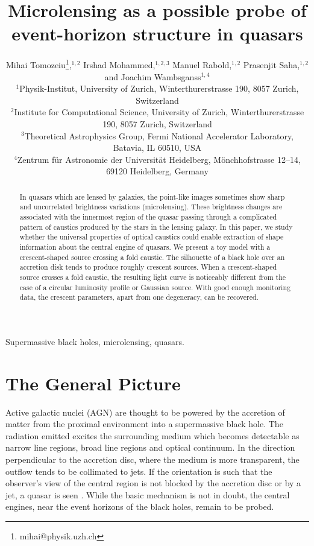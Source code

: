 \documentclass[usenatbib]{mn2e}
\title{Microlensing as a possible probe of event-horizon structure in quasars}
\author[Tomozeiu et al]{Mihai Tomozeiu\thanks{mihai@physik.uzh.ch},$^{1,2}$ 
Irshad Mohammed,$^{1,2,3}$ 
Manuel Rabold,$^{1,2}$
Prasenjit Saha,$^{1,2}$  
\newauthor
and Joachim Wambsganss$^{1,4}$\\
$^1${Physik-Institut, University of Zurich, Winterthurerstrasse 190,
  8057 Zurich, Switzerland} \\
$^2${Institute for Computational Science, University of Zurich,
  Winterthurerstrasse 190, 8057 Zurich, Switzerland} \\
$^3${Theoretical Astrophysics Group, Fermi National Accelerator Laboratory, Batavia, IL 60510, USA}\\
$^4${Zentrum f\"ur Astronomie der Universit\"at Heidelberg,
  M\"onchhofstrasse 12--14, 69120 Heidelberg, Germany}
}
\begin{document}
\maketitle

\begin{abstract}

In quasars which are lensed by galaxies, the point-like images sometimes show sharp and uncorrelated brightness 
variations (microlensing). These brightness changes are associated with the innermost region of the quasar passing 
through a complicated pattern of caustics produced by the stars in the lensing galaxy. In this paper, we study 
whether the universal properties of optical caustics could enable extraction of shape information about the central 
engine of quasars. We present a toy model with a crescent-shaped source crossing a fold caustic. The silhouette 
of a black hole over an accretion disk tends to produce roughly crescent sources. When a crescent-shaped source 
crosses a fold caustic, the resulting light curve is noticeably different from the case of a circular luminosity 
profile or Gaussian source. With good enough monitoring data, the crescent parameters, apart from one degeneracy, 
can be recovered.

\end{abstract}


\begin{keywords}
Supermassive black holes, microlensing, quasars.
\end{keywords}

\section{The General Picture }

Active galactic nuclei (AGN) are thought to be powered by the accretion of
matter from the proximal environment into a supermassive black hole.
The radiation emitted excites the surrounding medium which becomes
detectable as narrow line regions, broad line regions and optical
continuum.  In the direction perpendicular to the accretion disc,
where the medium is more transparent, the outflow tends to be
collimated to jets.  If the orientation is such that the observer's
view of the central region is not blocked by the accretion disc or by
a jet, a quasar is seen \citep[e.g.,][]{1984RvMP...56..255B}.  While
the basic mechanism \citep[originating in the work
  of][]{1964ApJ...140..796S,1964SPhD....9..246Z,1969Natur.223..690L}
is not in doubt, the central engines, near the event horizons of the
black holes, remain to be probed.
\end{document}
